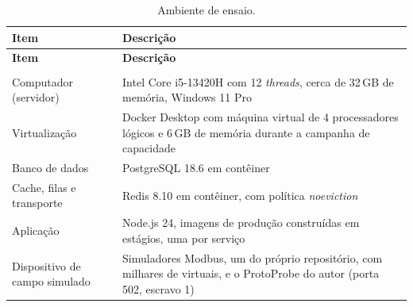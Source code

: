 {\renewcommand{\arraystretch}{1.3}\small
\begin{xltabular}{\textwidth}{lX}
        \caption{Ambiente de ensaio.}
        \label{tab:cap7_ambiente}\\
        \hline
        \textbf{Item} & \textbf{Descrição} \\
        \hline
        \endfirsthead
        \hline
        \textbf{Item} & \textbf{Descrição} \\
        \hline
        \endhead
        \endfoot
         \\
        \endlastfoot
        Computador (servidor) & Intel Core i5-13420H com 12 \emph{threads}, cerca de 32\,GB de memória, Windows 11 Pro \\
        \hline
        Virtualização & Docker Desktop com máquina virtual de 4 processadores lógicos e 6\,GB de memória durante a campanha de capacidade \\
        \hline
        Banco de dados & PostgreSQL 18.6 em contêiner \\
        \hline
        Cache, filas e transporte & Redis 8.10 em contêiner, com política \emph{noeviction} \\
        \hline
        Aplicação & Node.js 24, imagens de produção construídas em estágios, uma por serviço \\
        \hline
        Dispositivo de campo simulado & Simuladores Modbus, um do próprio repositório, com milhares de  virtuais, e o ProtoProbe do autor (porta 502, escravo 1) \\
        \hline
\end{xltabular}}

